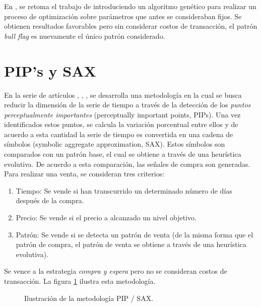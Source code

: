 \documentclass[12pt]{report}
\theoremstyle{break}
\theoremstyle{break}
\begin{document}
En \cite{Parracho2010}, se retoma el trabajo de \cite{Leigh2002} introduciendo un algoritmo genético para realizar un proceso de optimización sobre parámetros que antes se consideraban fijos. Se obtienen resultados favorables pero sin considerar costos de transacción, el patrón \textit{bull flag} es nuevamente el único patrón considerado.

\section{PIP's y SAX}
En la  serie de artículos \cite{Canelas2012-gecco}, \cite{Canelas2013-gecco}, \cite{Canelas2013-journal}, \cite{Leitao2016} se desarrolla una metodología en la cual se busca reducir la dimensión de la serie de tiempo a través de la detección de los \textit{puntos perceptualmente importantes} (perceptually important points, PIPs). Una vez identificados estos puntos, se calcula la variación porcentual entre ellos y de acuerdo a esta cantidad la serie de tiempo es convertida en una cadena de símbolos (symbolic aggregate approximation, SAX). Estos símbolos son comparados con un patrón base, el cual se obtiene a través de una heurística evolutiva. De acuerdo a esta comparación, las señales de compra son generadas. Para realizar una venta, se consideran tres criterios:
\begin{enumerate}
\item Tiempo: Se vende si han transcurrido un determinado número de días después de la compra.
\item Precio: Se vende si el precio a alcanzado un nivel objetivo.
\item Patrón: Se vende si se detecta un patrón de venta (de la misma forma que el patrón de compra, el patrón de venta se obtiene a través de una heurística evolutiva).
\end{enumerate}
 Se vence a la estrategia \textit{compra y espera} pero no se consideran costos de transacción. La figura \ref{imagen:pip sax} ilustra esta metodología.

\begin{figure}[ht]
\centering
{}
\caption{\label{imagen:pip sax} Ilustración de la metodología PIP / SAX.}
\end{figure}
\end{document}
